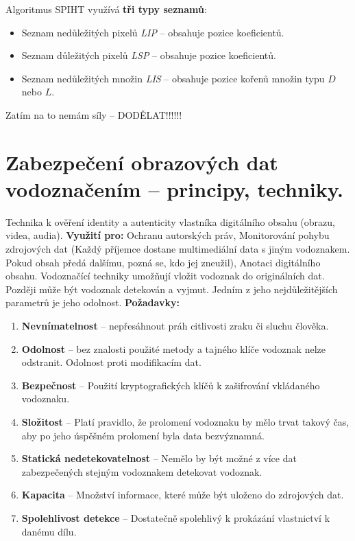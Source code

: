 Algoritmus SPIHT využívá \textbf{tři typy seznamů}: \vspace{-4mm}
\begin{itemize}
    \item Seznam nedůležitých pixelů \textit{LIP} -- obsahuje pozice koeficientů.
    \item Seznam důležitých pixelů \textit{LSP} -- obsahuje pozice koeficientů.
    \item Seznam nedůležitých množin \textit{LIS} -- obsahuje pozice kořenů množin typu $D$ nebo $L$.
\end{itemize}

Zatím na to nemám síly -- DODĚLAT!!!!!!

\section{Zabezpečení obrazových dat vodoznačením – principy, techniky.}

Technika k ověření identity a autenticity vlastníka digitálního obsahu (obrazu, videa, audia). \textbf{Využití pro:} Ochranu autorských práv, Monitorování pohybu zdrojových dat (Každý příjemce dostane multimediální data s jiným vodoznakem. Pokud obsah předá dalšímu, pozná se, kdo jej zneužil), Anotaci digitálního obsahu. Vodoznačící techniky umožňují vložit vodoznak do originálních dat. Později může být vodoznak detekován a vyjmut.  Jedním z jeho nejdůležitějších parametrů je jeho odolnost. \textbf{Požadavky:}

\begin{enumerate}
\item \textbf{Nevnímatelnost} -- nepřesáhnout práh citlivosti zraku či sluchu člověka.
\item \textbf{Odolnost} -- bez znalosti použité metody a tajného klíče vodoznak nelze odstranit. Odolnost proti modifikacím dat.
\item \textbf{Bezpečnost} -- Použití kryptografických klíčů k zašifrování vkládaného vodoznaku.
\item \textbf{Složitost} -- Platí pravidlo, že prolomení vodoznaku by mělo trvat takový čas, aby po jeho úspěšném prolomení byla data bezvýznamná.
\item \textbf{Statická nedetekovatelnost} -- Nemělo by být možné z více dat zabezpečených stejným vodoznakem detekovat vodoznak.
\item \textbf{Kapacita} -- Množství informace, které může být uloženo do zdrojových dat.
\item \textbf{Spolehlivost detekce} -- Dostatečně spolehlivý k prokázání vlastnictví k danému dílu.
\end{enumerate}

